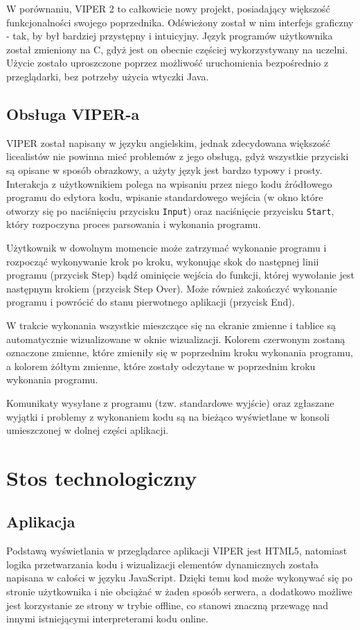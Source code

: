 \documentclass[a4paper,twoside,openright,11pt]{report}
\begin{document}
\par W porównaniu, VIPER 2 to całkowicie nowy projekt, posiadający większość funkcjonalności swojego poprzednika. Odświeżony został w nim interfejs graficzny - tak, by był bardziej przystępny i intuicyjny. Język programów użytkownika został zmieniony na C, gdyż jest on obecnie częściej wykorzystywany na uczelni. Użycie zostało uproszczone poprzez możliwość uruchomienia bezpośrednio z przeglądarki, bez potrzeby użycia wtyczki Java.

  \section{Obsługa VIPER-a}
\par VIPER został napisany w języku angielskim, jednak zdecydowana większość licealistów nie powinna mieć problemów z jego obsługą, gdyż wszystkie przyciski są opisane w sposób obrazkowy, a użyty język jest bardzo typowy i prosty. Interakcja z użytkownikiem polega na wpisaniu przez niego kodu źródłowego programu do edytora kodu, wpisanie standardowego wejścia (w okno które otworzy się po naciśnięciu przycisku \texttt{Input}) oraz naciśnięcie przycisku \texttt{Start}, który rozpoczyna proces parsowania i wykonania programu. 
\par Użytkownik w dowolnym momencie może zatrzymać wykonanie programu i rozpocząć wykonywanie krok po kroku, wykonując skok do następnej linii programu (przycisk Step) bądź ominięcie wejścia do funkcji, której wywołanie jest następnym krokiem (przycisk Step Over). Może również zakończyć wykonanie programu i powrócić do stanu pierwotnego aplikacji (przycisk End).
\par W trakcie wykonania wszystkie mieszczące się na ekranie zmienne i tablice są automatycznie wizualizowane w oknie wizualizacji. Kolorem czerwonym zostaną oznaczone zmienne, które zmieniły się w poprzednim kroku wykonania programu, a kolorem żółtym zmienne, które zostały odczytane w poprzednim kroku wykonania programu. 
\par Komunikaty wysyłane z programu (tzw. standardowe wyjście) oraz zgłaszane wyjątki i problemy z wykonaniem kodu są na bieżąco wyświetlane w konsoli umieszczonej w dolnej części aplikacji. 

  \chapter{Stos technologiczny}

  \section{Aplikacja}
\par Podstawą wyświetlania w przeglądarce aplikacji VIPER jest HTML5, natomiast logika przetwarzania kodu i wizualizacji elementów dynamicznych została napisana w całości w języku JavaScript. Dzięki temu kod może wykonywać się po stronie użytkownika i nie obciążać w żaden sposób serwera, a dodatkowo możliwe jest korzystanie ze strony w trybie offline, co stanowi znaczną przewagę nad innymi istniejącymi interpreterami kodu online.
\end{document}
